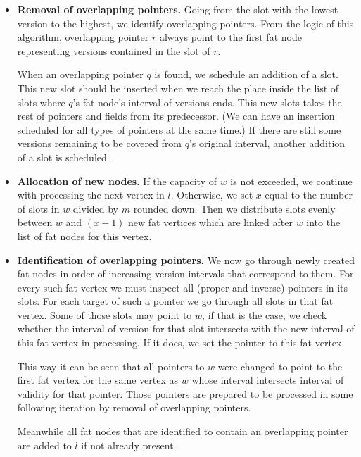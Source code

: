 \begin{itemize}
\item {\bf Removal of overlapping pointers.} Going from the slot with the lowest version to the highest, we identify overlapping pointers. From the logic of this algorithm, overlapping pointer $r$ always point to the first fat node representing versions contained in the slot of $r$. 

When an overlapping pointer $q$ is found, we schedule an addition of a slot. This new slot should be inserted when we reach the place inside the list of slots where $q$'s fat node's interval of versions ends. This new slots takes the rest of pointers and fields from its predecessor. (We can have an insertion scheduled for all types of pointers at the same time.) If there are still some versions remaining to be covered from $q$'s original interval, another addition of a slot is scheduled.

\item {\bf Allocation of new nodes.} If the capacity of $w$ is not exceeded, we continue with processing the next vertex in $l$. Otherwise, we set $x$ equal to the number of slots in $w$ divided by $m$ rounded down. Then we distribute slots evenly between $w$ and $(x-1)$ new fat vertices which are linked after $w$ into the list of fat nodes for this vertex.

\item {\bf Identification of overlapping pointers.} We now go through newly created fat nodes in order of increasing version intervals that correspond to them. For every such fat vertex we must inspect all (proper and inverse) pointers in its slots. For each target of such a pointer we go through all slots in that fat vertex. Some of those slots may point to $w$, if that is the case, we check whether the interval of version for that slot intersects with the new interval of this fat vertex in processing. If it does, we set the pointer to this fat vertex.

This way it can be seen that all pointers to $w$ were changed to point to the first fat vertex for the same vertex as $w$ whose interval intersects interval of validity for that pointer. Those pointers are prepared to be processed in some following iteration by removal of overlapping pointers.

Meanwhile all fat nodes that are identified to contain an overlapping pointer are added to $l$ if not already present.
\end{itemize}



